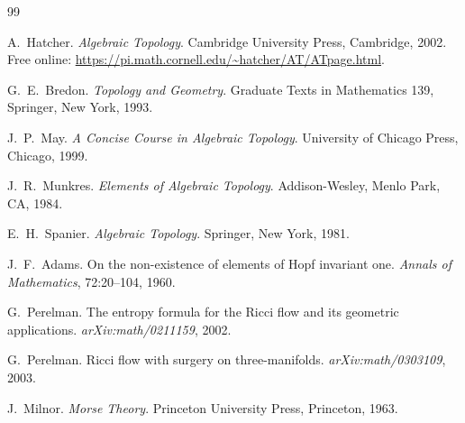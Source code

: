 \documentclass[12pt,a4paper]{amsart}
\theoremstyle{definition}
\begin{document}
\begin{thebibliography}{99}

A.~Hatcher.
\newblock \textit{Algebraic Topology}.
\newblock Cambridge University Press, Cambridge, 2002.
\newblock Free online: \url{https://pi.math.cornell.edu/~hatcher/AT/ATpage.html}.

G.~E.~Bredon.
\newblock \textit{Topology and Geometry}.
\newblock Graduate Texts in Mathematics 139, Springer, New York, 1993.

J.~P.~May.
\newblock \textit{A Concise Course in Algebraic Topology}.
\newblock University of Chicago Press, Chicago, 1999.

J.~R.~Munkres.
\newblock \textit{Elements of Algebraic Topology}.
\newblock Addison-Wesley, Menlo Park, CA, 1984.

E.~H.~Spanier.
\newblock \textit{Algebraic Topology}.
\newblock Springer, New York, 1981.

J.~F.~Adams.
\newblock On the non-existence of elements of Hopf invariant one.
\newblock \textit{Annals of Mathematics}, 72:20--104, 1960.

G.~Perelman.
\newblock The entropy formula for the Ricci flow and its geometric applications.
\newblock \textit{arXiv:math/0211159}, 2002.

G.~Perelman.
\newblock Ricci flow with surgery on three-manifolds.
\newblock \textit{arXiv:math/0303109}, 2003.

J.~Milnor.
\newblock \textit{Morse Theory}.
\newblock Princeton University Press, Princeton, 1963.

\end{thebibliography}
\end{document}
